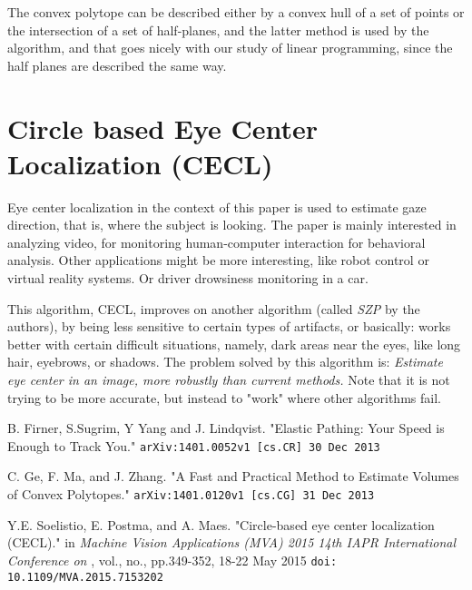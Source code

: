 \documentclass[11pt]{article}
\begin{document}
The convex polytope can be described either by a convex hull of a set of points or the intersection of a set of half-planes, and the latter method is used by the algorithm, and that goes nicely with our study of linear programming, since the half planes are described the same way.

\section{Circle based Eye Center Localization (CECL)\cite{Soelistio}}
Eye center localization in the context of this paper is used to estimate gaze direction, that is, where the subject is looking. The paper is mainly interested in analyzing video, for monitoring human-computer interaction for behavioral analysis. Other applications might be more interesting, like robot control or virtual reality systems. Or driver drowsiness monitoring in a car.

This algorithm, CECL, improves on another algorithm (called {\em SZP} by the authors), by being less sensitive to certain types of artifacts, or basically:  works better with certain difficult situations, namely, dark areas near the eyes, like long hair, eyebrows, or shadows.
The problem solved by this algorithm is:  {\em Estimate eye center in an image, more robustly than current methods.}  Note that it is not trying to be more accurate, but instead to "work" where other algorithms fail.

\begin{thebibliography}{10}

  B. Firner, S.Sugrim, Y Yang and J. Lindqvist. "Elastic Pathing: Your Speed is Enough to Track You." {\tt arXiv:1401.0052v1 [cs.CR] 30 Dec 2013}

 C. Ge, F. Ma,  and J. Zhang. "A Fast and Practical Method to Estimate Volumes of Convex Polytopes." {\tt arXiv:1401.0120v1 [cs.CG] 31 Dec 2013}


 Y.E. Soelistio, E. Postma, and A. Maes. "Circle-based eye center localization (CECL)." in {\em Machine Vision Applications (MVA) 2015 14th IAPR International Conference on} , vol., no., pp.349-352, 18-22 May 2015
{\tt doi: 10.1109/MVA.2015.7153202}


\end{thebibliography}
\end{document}
